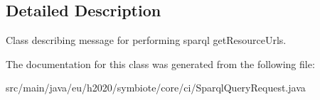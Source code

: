 \subsection{Detailed Description}
Class describing message for performing sparql get\+Resource\+Urls. 

The documentation for this class was generated from the following file\+:\begin{DoxyCompactItemize}
\item 
src/main/java/eu/h2020/symbiote/core/ci/Sparql\+Query\+Request.\+java\end{DoxyCompactItemize}
